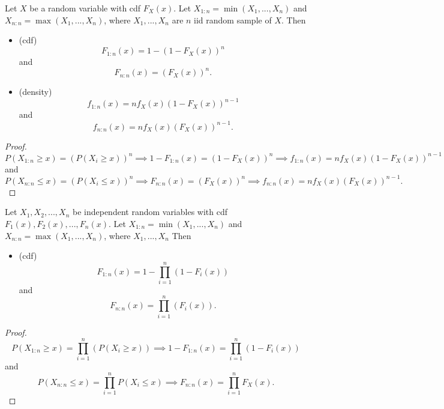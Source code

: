 \begin{refsection}
\begin{lemma}\label{ch:statistical-models:th:distributionMaxMinofRandomVariableOfSameDistribution}
	Let $X$ be a random variable with cdf $F_X(x)$. Let $X_{1:n} = \min(X_1,...,X_n)$ and $X_{n:n} = \max(X_1,...,X_n)$, where $X_1,...,X_n$ are $n$ iid random sample of $X$. Then
	\begin{itemize}
		\item (cdf)			
		$$ F_{1:n}(x) = 1 - (1 - F_X(x))^{n}$$
		and
		$$ F_{n:n}(x) = (F_X(x))^{n}.$$
		\item (density)
			$$ f_{1:n}(x) = nf_X(x)(1 - F_X(x))^{n-1}$$
		and
		$$ f_{n:n}(x) = nf_X(x)(F_X(x))^{n-1}.$$
	\end{itemize}
\end{lemma}
\begin{proof}
	$$P(X_{1:n}\geq x) = (P(X_i\geq x))^n \implies 1 - F_{1:n}(x) = (1 - F_X(x))^n \implies f_{1:n}(x) = nf_X(x)(1 - F_X(x))^{n-1}$$
	and
	$$P(X_{n:n}\leq x) = (P(X_i\leq x))^n \implies  F_{n:n}(x) = (F_X(x))^n \implies f_{n:n}(x) = nf_X(x)(F_X(x))^{n-1}.$$
\end{proof}

\begin{lemma}\label{ch:statistical-models:th:distributionMaxMinofRandomVariableOfDifferentDistribution}
	Let $X_1,X_2,...,X_n$ be independent random variables with cdf $F_1(x),F_2(x),...,F_n(x)$. Let $X_{1:n} = \min(X_1,...,X_n)$ and $X_{n:n} = \max(X_1,...,X_n)$, where $X_1,...,X_n$ Then
	\begin{itemize}
		\item (cdf)			
		$$ F_{1:n}(x) = 1 - \prod_{i=1}^n(1 - F_i(x))$$
		and
		$$ F_{n:n}(x) = \prod_{i=1}^n (F_i(x)).$$
	\end{itemize}
\end{lemma}
\begin{proof}
	$$P(X_{1:n}\geq x) = \prod_{i=1}^n(P(X_i\geq x)) \implies 1 - F_{1:n}(x) = \prod_{i=1}^n(1 - F_i(x))$$
	and
	$$P(X_{n:n}\leq x) = \prod_{i=1}^n P(X_i\leq x) \implies  F_{n:n}(x) = \prod_{i=1}^n F_X(x).$$
\end{proof}



\end{refsection}

